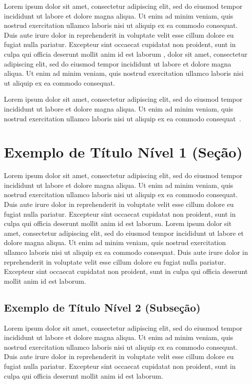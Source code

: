 \documentclass[portuguese]{sbc2025}%
\begin{document}
Lorem ipsum dolor sit amet, consectetur adipiscing elit, sed do eiusmod tempor incididunt ut labore et dolore magna aliqua. Ut enim ad minim veniam, quis nostrud exercitation ullamco laboris nisi ut aliquip ex ea commodo consequat. Duis aute irure dolor in reprehenderit in voluptate velit esse cillum dolore eu fugiat nulla pariatur. Excepteur sint occaecat cupidatat non proident, sunt in culpa qui officia deserunt mollit anim id est laborum \citep{ref3}, dolor sit amet, consectetur adipiscing elit, sed do eiusmod tempor incididunt ut labore et dolore magna aliqua. Ut enim ad minim veniam, quis nostrud exercitation ullamco laboris nisi ut aliquip ex ea commodo consequat.

Lorem ipsum dolor sit amet, consectetur adipiscing elit, sed do eiusmod tempor incididunt ut labore et dolore magna aliqua. Ut enim ad minim veniam, quis nostrud exercitation ullamco laboris nisi ut aliquip ex ea commodo consequat~\citep{ref4}.


 
\section{Exemplo de Título Nível 1 (Seção)}
Lorem ipsum dolor sit amet, consectetur adipiscing elit, sed do eiusmod tempor incididunt ut labore et dolore magna aliqua. Ut enim ad minim veniam, quis nostrud exercitation ullamco laboris nisi ut aliquip ex ea commodo consequat. Duis aute irure dolor in reprehenderit in voluptate velit esse cillum dolore eu fugiat nulla pariatur. Excepteur sint occaecat cupidatat non proident, sunt in culpa qui officia deserunt mollit anim id est laborum. Lorem ipsum dolor sit amet, consectetur adipiscing elit, sed do eiusmod tempor incididunt ut labore et dolore magna aliqua. Ut enim ad minim veniam, quis nostrud exercitation ullamco laboris nisi ut aliquip ex ea commodo consequat. Duis aute irure dolor in reprehenderit in voluptate velit esse cillum dolore eu fugiat nulla pariatur. Excepteur sint occaecat cupidatat non proident, sunt in culpa qui officia deserunt mollit anim id est laborum.

\subsection{Exemplo de Título Nível 2 (Subseção)}

Lorem ipsum dolor sit amet, consectetur adipiscing elit, sed do eiusmod tempor incididunt ut labore et dolore magna aliqua. Ut enim ad minim veniam, quis nostrud exercitation ullamco laboris nisi ut aliquip ex ea commodo consequat. Duis aute irure dolor in reprehenderit in voluptate velit esse cillum dolore eu fugiat nulla pariatur. Excepteur sint occaecat cupidatat non proident, sunt in culpa qui officia deserunt mollit anim id est laborum.
\end{document}
